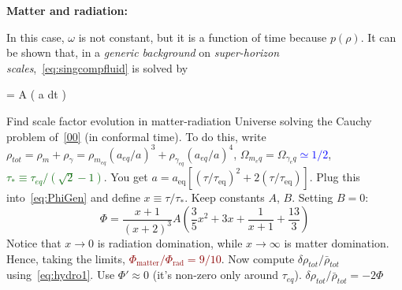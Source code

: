 \begin{mycolorbox}
    \textbf{Matter and radiation:} 
    
    In this case, $\omega$ is not constant, but it is a function of time because $p(\rho)$. It can be shown that, in a \textit{generic background} on \textit{super-horizon scales},~\eqref{eq:singcompfluid} is solved by
    \begin{eqopt}[darkred]\label{eq:PhiGen}
     \Phi = A  \left(  \int a dt \right)
    \end{eqopt}
    Find scale factor evolution in matter-radiation Universe solving the Cauchy problem of~\eqref{00} (in conformal time). To do this, write $\rho_{tot}=\rho_m+\rho_\gamma= \rho_{m_{eq}}(a_{eq}/a)^3+\rho_{\gamma_{eq}}(a_{eq}/a)^4$, $\Omega_{m_eq}=\Omega_{\gamma_eq}$\textcolor{blue}{$\simeq 1/2$}, \textcolor{darkgreen}{$\tau_*\equiv \tau_{eq}/(\sqrt{2}-1)$}.
    You get $ a = a_{\mathrm{eq}}\!\left[\left(\tau/\tau_{\mathrm{eq}}\right)^{2}
      + 2\left(\tau/\tau_{\mathrm{eq}}\right)\right]$.
    Plug this into~\eqref{eq:PhiGen} and define $x\equiv \tau/\tau_*$. Keep constants $A$, $B$. Setting $B=0$:
    \begin{equation}
        \Phi = \frac{x + 1}{(x + 2)^{3}}
         A\!\left(\frac{3}{5}x^{2} + 3x + \frac{1}{x + 1} + \frac{13}{3}\right)  
    \end{equation}
    Notice that $x \rightarrow 0$ is radiation domination, while $x\rightarrow \infty$ is matter domination. 
    Hence, taking the limits, \textcolor{darkred}{$\Phi_{\mathrm{matter}}/\Phi_{\mathrm{rad}} = 9/10$}.
    Now compute $\delta \rho_{tot}/ \bar{\rho}_{tot}$ using~\eqref{eq:hydro1}. Use $\Phi'\approx 0$ (it's non-zero only around $\tau_{eq}$). $\delta \rho_{tot}/ \bar{\rho}_{tot}=-2\Phi$
\end{mycolorbox}

    

    